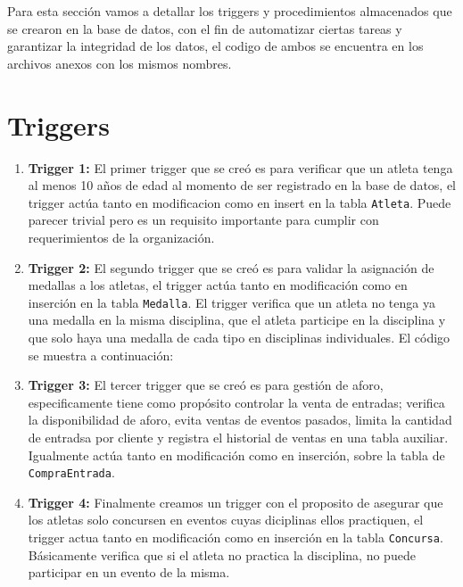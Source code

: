 Para esta sección vamos a detallar los triggers y procedimientos almacenados que se crearon en la base de datos, con el fin de automatizar ciertas tareas y garantizar la integridad de los datos, el codigo de ambos se encuentra en los archivos anexos con los mismos nombres.

\section{Triggers}

\begin{enumerate}
    \item \textbf{Trigger 1:} 
    El primer trigger que se creó es para verificar que un atleta tenga al menos 10 años de edad al momento de ser registrado en la base de datos, el trigger actúa tanto en modificacion como en insert en la tabla \texttt{Atleta}. Puede parecer trivial pero es un requisito importante para cumplir con requerimientos de la organización.

    \item \textbf{Trigger 2:} 
    El segundo trigger que se creó es para validar la asignación de medallas a los atletas, el trigger actúa tanto en modificación como en inserción en la tabla \texttt{Medalla}. El trigger verifica que un atleta no tenga ya una medalla en la misma disciplina, que el atleta participe en la disciplina y que solo haya una medalla de cada tipo en disciplinas individuales. El código se muestra a continuación: \vspace{0.5cm}

    \item \textbf{Trigger 3:}
    El tercer trigger que se creó es para gestión de aforo, especificamente tiene como propósito controlar la venta de entradas; verifica la disponibilidad de aforo, evita ventas de eventos pasados, limita la cantidad de entradsa por cliente y registra el historial de ventas en una tabla auxiliar. Igualmente actúa tanto en modificación como en inserción, sobre la tabla de \texttt{CompraEntrada}.\vspace{0.5cm}

    \item \textbf{Trigger 4:}
    Finalmente creamos un trigger con el proposito de asegurar que los atletas solo concursen en eventos cuyas diciplinas ellos practiquen, el trigger actua tanto en modificación como en inserción en la tabla \texttt{Concursa}. Básicamente verifica que si el atleta no practica la disciplina, no puede participar en un evento de la misma.\vspace{0.5cm}

\end{enumerate}

